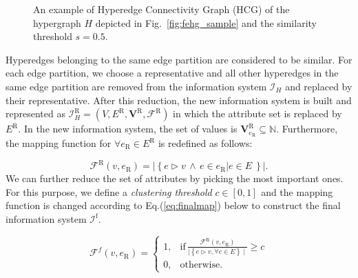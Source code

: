 \documentclass[twocolumn]{svjour3}          \smartqed
\begin{document}
\begin{figure}[ht]
{
}\caption{An example of Hyperedge Connectivity Graph (HCG) of the hypergraph $H$ depicted in Fig.~\ref{fig:fehg_sample} and the similarity threshold $s=0.5$.}\label{fig:hcg_sample}
\end{figure}


Hyperedges belonging to the same edge partition are considered to be  similar. For each edge partition, we choose a representative and all other hyperedges in the same edge partition are removed from the information system $\mathcal{I}_{H}$ and replaced by their representative. After this reduction, the new information system is built and represented as $\mathcal{I}^{\mathrm{R}}_{H} = \left( V,E^{\mathrm{R}},\mathbf{V}^{\mathrm{R}},\mathcal{F}^{\mathrm{R}} \right)$ in which the attribute set is replaced by $E^{\mathrm{R}}$. In the new information system, the set of values is $\mathbf{V}^{\mathrm{R}}_{e_{\mathrm{R}}} \subseteq \mathbb{N}$. Furthermore, the mapping function for $\forall e_{\mathrm{R}} \in E^{\mathrm{R}}$ is redefined as follows:


\begin{equation}
\label{eq:epart_map}
\mathcal{F}^{\mathrm{R}}(v,e_{\mathrm{R}})=\left\vert {\left\lbrace e \triangleright v \, \wedge \, e \in e_{\mathrm{R}} |  e \in E \ \right\rbrace} \right\vert.
\end{equation}
We can further reduce the set of attributes by picking the most important ones. For this purpose, we define a \textit{clustering threshold} $c \in [0,1]$ and the mapping function is changed according to Eq.(\ref{eq:finalmap}) below to construct the final information system $\mathcal{I}^{\mathrm{f}}$. 

\begin{equation}\label{eq:finalmap}
\mathcal{F}^f(v,e_{\mathrm{R}}) = 
\begin{cases}
 1, & \mbox{if} \, \frac{\mathcal{F}^{\mathrm{R}}(v,e_{\mathrm{R}})}{\mid \left\lbrace e \triangleright v, \forall e \in E\right\rbrace \mid} \geqslant c\\
 0, & \mbox{otherwise}.
\end{cases}
\end{equation}
\end{document}
